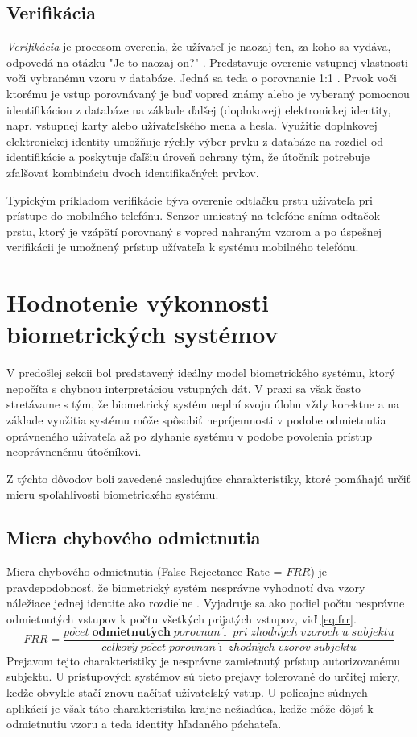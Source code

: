 \subsection{Verifikácia}
\emph{Verifikácia} je procesom overenia, že užívateľ je naozaj ten, za koho sa vydáva, odpovedá na otázku "Je to naozaj on?" \cite{bio3}. Predstavuje overenie vstupnej vlastnosti voči vybranému vzoru v databáze. Jedná sa teda o porovnanie 1:1 \cite{bio}. Prvok voči ktorému je vstup porovnávaný je buď vopred známy alebo je vyberaný pomocnou identifikáciou z databáze na základe ďalšej (doplnkovej) elektronickej identity, napr. vstupnej karty alebo užívateľského mena a hesla.  Využitie doplnkovej elektronickej identity umožňuje rýchly výber prvku z databáze na rozdiel od identifikácie a poskytuje ďaľšiu úroveň ochrany tým, že útočník potrebuje zfalšovať kombináciu dvoch identifikačných prvkov.

Typickým príkladom verifikácie býva overenie odtlačku prstu užívateľa pri prístupe do mobilného telefónu. Senzor umiestný na telefóne sníma odtačok prstu, ktorý je vzápätí porovnaný s vopred nahraným vzorom a po úspešnej verifikácii je umožnený prístup užívateľa k systému mobilného telefónu.

\section{Hodnotenie výkonnosti biometrických systémov}\label{sec:syscheck}
V predošlej sekcii bol predstavený ideálny model biometrického systému, ktorý nepočíta s chybnou interpretáciou vstupných dát. V praxi sa však často stretávame s tým, že biometrický systém neplní svoju úlohu vždy korektne a na základe využitia systému môže spôsobiť nepríjemnosti v podobe odmietnutia oprávneného užívateľa až po zlyhanie systému v podobe povolenia prístup neoprávnenému útočníkovi.

Z týchto dôvodov boli zavedené nasledujúce charakteristiky, ktoré pomáhajú určiť mieru spoľahlivosti biometrického systému.

\subsection{Miera chybového odmietnutia}
Miera chybového odmietnutia (False-Rejectance Rate = $FRR$) je pravdepodobnosť, že biometrický systém nesprávne vyhodnotí dva vzory náležiace jednej identite ako rozdielne \cite{bio3}. Vyjadruje sa ako podiel počtu nesprávne odmietnutých vstupov k počtu všetkých prijatých vstupov, viď \ref{eq:frr}.
\begin{equation}\label{eq:frr}
FRR = \frac{po\check{c}et \; \mathbf{odmietnut\acute{y}ch} \; porovnan\acute{\imath} \; pri \; zhodn\acute{y}ch \; vzoroch \; u \; subjektu}{celkov\acute{y} \; po\check{c}et \; porovnan\acute{\imath} \; zhodn\acute{y}ch \; vzorov \; subjektu}
\end{equation} 
Prejavom tejto charakteristiky je nesprávne zamietnutý prístup autorizovanému subjektu. U prístupových systémov sú tieto prejavy tolerované do určitej miery, kedže obvykle stačí znovu načítať užívateľský vstup. U policajne-súdnych aplikácií je však táto charakteristika krajne nežiadúca, kedže môže dôjsť k odmietnutiu vzoru a teda identity hľadaného páchateľa.


